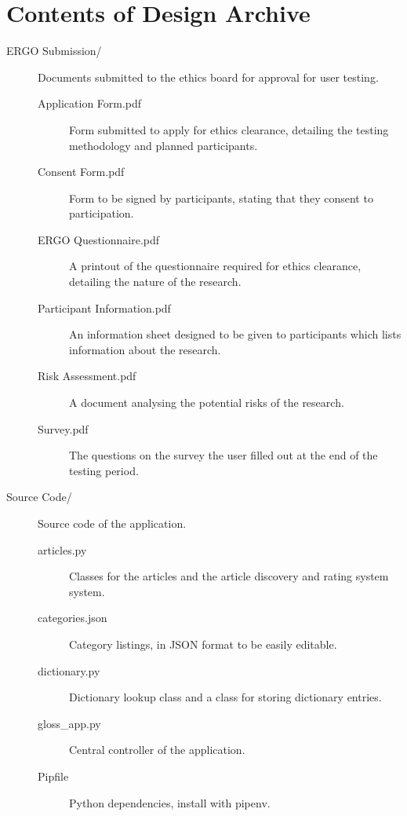 \chapter{Contents of Design Archive}
\begin{description}
	\item[ERGO Submission/] Documents submitted to the ethics board for approval for user testing.
	\begin{description}
		\item[Application Form.pdf] Form submitted to apply for ethics clearance, detailing the testing methodology and planned participants.
		
		\item[Consent Form.pdf] Form to be signed by participants, stating that they consent to participation.
		
		\item[ERGO Questionnaire.pdf] A printout of the questionnaire required for ethics clearance, detailing the nature of the research.
		
		\item[Participant Information.pdf] An information sheet designed to be given to participants which lists information about the research.
		
		\item[Risk Assessment.pdf] A document analysing the potential risks of the research.
		
		\item[Survey.pdf] The questions on the survey the user filled out at the end of the testing period. 
	\end{description}
	
	\item[Source Code/] Source code of the application.
	\begin{description}
	\item[articles.py] Classes for the articles and the article discovery and rating system system.
	
	\item[categories.json] Category listings, in JSON format to be easily editable.
	
	\item[dictionary.py] Dictionary lookup class and a class for storing dictionary entries.
	
	\item[gloss\_app.py] Central controller of the application.
	
	\item[Pipfile] Python dependencies, install with pipenv.
	

\end{description}
\end{description}
